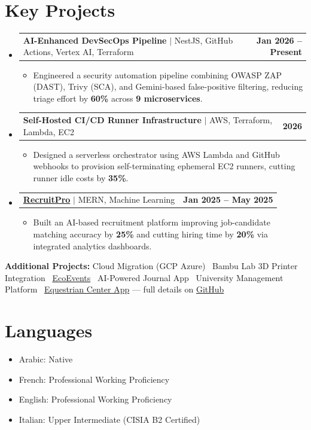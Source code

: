 \documentclass[letterpaper,11pt]{article}
\makeatletter
\newcommand{\resumeItem}[1]{\item\small{#1 \vspace{-2pt}}}
\newcommand{\resumeProjectHeading}[2]{
    \item
    \begin{tabular*}{1.0\textwidth}{l@{\extracolsep{\fill}}r}
      \small #1 & \textbf{\small #2}\\
    \end{tabular*}\vspace{-7pt}
}
\newcommand{\resumeItemListStart}{\begin{itemize}}
\newcommand{\resumeItemListEnd}{\end{itemize}\vspace{-5pt}}
\newcommand{\resumeSubHeadingListStart}{\begin{itemize}[leftmargin=0in, label={}]}
\newcommand{\resumeSubHeadingListEnd}{\end{itemize}}
\makeatother
\begin{document}
\section{Key Projects}
\resumeSubHeadingListStart

    \resumeProjectHeading
      {\textbf{AI-Enhanced DevSecOps Pipeline} $|$ NestJS, GitHub Actions, Vertex AI, Terraform}{Jan 2026 -- Present}
      \resumeItemListStart
        \resumeItem{Engineered a security automation pipeline combining OWASP ZAP (DAST), Trivy (SCA), and Gemini-based false-positive filtering, reducing triage effort by \textbf{60\%} across \textbf{9 microservices}.}
      \resumeItemListEnd

    \resumeProjectHeading
      {\textbf{Self-Hosted CI/CD Runner Infrastructure} $|$ AWS, Terraform, Lambda, EC2}{2026}
      \resumeItemListStart
        \resumeItem{Designed a serverless orchestrator using AWS Lambda and GitHub webhooks to provision self-terminating ephemeral EC2 runners, cutting runner idle costs by \textbf{35\%}.}
      \resumeItemListEnd

    \resumeProjectHeading
      {\href{https://github.com/ghayth002}{\textbf{RecruitPro}} $|$ MERN, Machine Learning}{Jan 2025 -- May 2025}
      \resumeItemListStart
        \resumeItem{Built an AI-based recruitment platform improving job-candidate matching accuracy by \textbf{25\%} and cutting hiring time by \textbf{20\%} via integrated analytics dashboards.}
      \resumeItemListEnd

\resumeSubHeadingListEnd

\small{\textbf{Additional Projects:} Cloud Migration (GCP\,\textrightarrow\,Azure) \textbullet\ Bambu Lab 3D Printer Integration \textbullet\ \href{https://ecoevents-5twin5-1.onrender.com}{EcoEvents} \textbullet\ AI-Powered Journal App \textbullet\ University Management Platform \textbullet\ \href{https://github.com/ghayth002/PiDev-EquitationCenter}{Equestrian Center App} --- full details on \href{https://github.com/ghayth002}{GitHub}}

\section{Languages}
\resumeSubHeadingListStart
    \resumeItem{Arabic: Native}
    \resumeItem{French: Professional Working Proficiency}
    \resumeItem{English: Professional Working Proficiency}
    \resumeItem{Italian: Upper Intermediate (CISIA B2 Certified)}
\resumeSubHeadingListEnd
\end{document}
